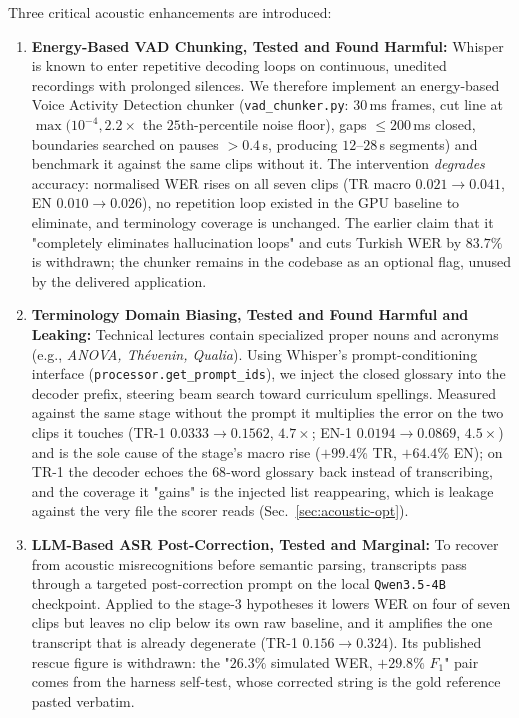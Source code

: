 \documentclass[conference]{IEEEtran}
\begin{document}
Three critical acoustic enhancements are introduced:
\begin{enumerate}
\item \textbf{Energy-Based VAD Chunking, Tested and Found Harmful:} Whisper is known to enter repetitive decoding loops on continuous, unedited recordings with prolonged silences. We therefore implement an energy-based Voice Activity Detection chunker (\texttt{vad\_chunker.py}: $30$\,ms frames, cut line at $\max(10^{-4}, 2.2 \times$ the $25$th-percentile noise floor), gaps $\le 200$\,ms closed, boundaries searched on pauses $>0.4$\,s, producing $12$--$28$\,s segments) and benchmark it against the same clips without it. The intervention \emph{degrades} accuracy: normalised WER rises on all seven clips (TR macro $0.021 \rightarrow 0.041$, EN $0.010 \rightarrow 0.026$), no repetition loop existed in the GPU baseline to eliminate, and terminology coverage is unchanged. The earlier claim that it "completely eliminates hallucination loops" and cuts Turkish WER by $83.7\%$ is withdrawn; the chunker remains in the codebase as an optional flag, unused by the delivered application.
\item \textbf{Terminology Domain Biasing, Tested and Found Harmful and Leaking:} Technical lectures contain specialized proper nouns and acronyms (e.g., \emph{ANOVA, Th\'evenin, Qualia}). Using Whisper's prompt-conditioning interface (\texttt{processor.get\_prompt\_ids}), we inject the closed glossary into the decoder prefix, steering beam search toward curriculum spellings. Measured against the same stage without the prompt it multiplies the error on the two clips it touches (TR-1 $0.0333 \rightarrow 0.1562$, $4.7\times$; EN-1 $0.0194 \rightarrow 0.0869$, $4.5\times$) and is the sole cause of the stage's macro rise ($+99.4\%$ TR, $+64.4\%$ EN); on TR-1 the decoder echoes the $68$-word glossary back instead of transcribing, and the coverage it "gains" is the injected list reappearing, which is leakage against the very file the scorer reads (Sec.~\ref{sec:acoustic-opt}).
\item \textbf{LLM-Based ASR Post-Correction, Tested and Marginal:} To recover from acoustic misrecognitions before semantic parsing, transcripts pass through a targeted post-correction prompt on the local \texttt{Qwen3.5-4B} checkpoint. Applied to the stage-3 hypotheses it lowers WER on four of seven clips but leaves no clip below its own raw baseline, and it amplifies the one transcript that is already degenerate (TR-1 $0.156 \rightarrow 0.324$). Its published rescue figure is withdrawn: the "$26.3\%$ simulated WER, $+29.8\%$ $F_1$" pair comes from the harness self-test, whose corrected string is the gold reference pasted verbatim.
\end{enumerate}
\end{document}
